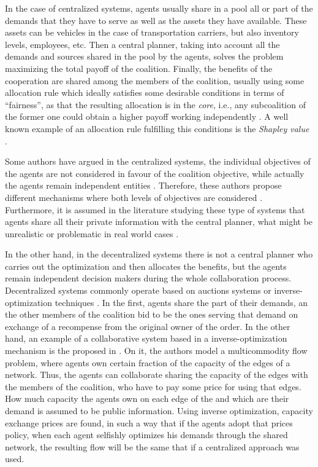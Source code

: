 \documentclass[review]{elsarticle}
\begin{document}
In the case of centralized systems, agents usually share in a pool all or
part of the demands that they have to serve as well as the assets they have
available. These assets can be vehicles in the case of transportation carriers,
but also inventory levels, employees, etc. Then a central planner, taking into
account all the demands and sources shared in the pool by the agents, solves the
problem maximizing the total payoff of the coalition. Finally, the benefits of
the cooperation are shared among the members of the coalition, usually using
some allocation rule which ideally satisfies some desirable conditions in
terms of ``fairness'', as that the resulting allocation is in the \emph{core},
i.e., any subcoalition of the former one could obtain a higher payoff working
independently \cite{GONZALEZ2010}. A well known example of an allocation rule
fulfilling this conditions is the \emph{Shapley value} \cite{SHAPLEY1952}.

Some authors have argued in the centralized systems, the individual objectives
of the agents are not considered in favour of the coalition objective, while
actually the agents remain independent entities \cite{DEFRYN2018891}. Therefore,
these authors propose different mechanisms where both levels of objectives are
considered \cite{DEFRYN20191} \cite{VANOVERMEIRE2014125}. Furthermore, it is assumed
in the literature studying these type of systems that agents share all their private information
with the central planner, what might be unrealistic or problematic in real world cases \cite{SERRANO2017} \cite{ZENG2015}.

In the other hand, in the decentralized systems there is not a central planner
who carries out the optimization and then allocates the benefits, but the agents
remain independent decision makers during the whole collaboration process.
Decentralized systems commonly operate based on auctions systems or
inverse-optimization techniques \cite{XIAOZHOU2013}. In the first, agents share
the part of their demands, an the other members of the coalition bid to be the
ones serving that demand on exchange of a recompense from the original owner of
the order. In the other hand, an example of a collaborative system based in a
inverse-optimization mechanism is the proposed in \cite{AGARWAL2008520}. On it,
the authors model a multicommodity flow problem, where agents own certain
fraction of the capacity of the edges of a network. Thus, the agents can
collaborate sharing the capacity of the edges with the members of the coalition,
who have to pay some price for using that edges. How much capacity the agents
own on each edge of the and which are their demand is assumed to be public
information. Using inverse optimization, capacity exchange prices are
found, in such a way that if the agents adopt that prices policy, when each
agent selfishly optimizes his demands through the shared network, the resulting
flow will be the same that if a centralized approach was used. 
\end{document}
